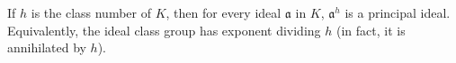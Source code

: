 If $h$ is the class number of $K$, then for every ideal $\mathfrak{a}$ in $K$, $\mathfrak{a}^h$ is a principal ideal. Equivalently, the ideal class group has exponent dividing $h$ (in fact, it is annihilated by $h$).
